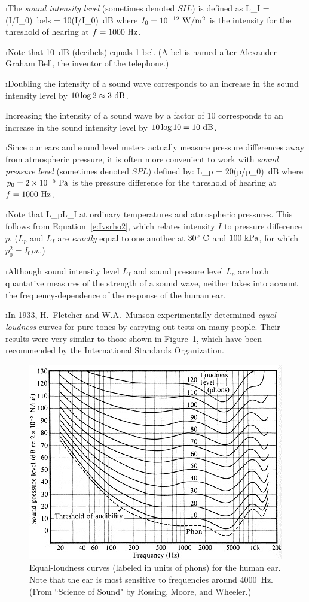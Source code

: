 \i The {\em sound intensity level} 
(sometimes denoted $SIL$) is defined as
%
\be
L_I = \log(I/I_0)\ {\rm bels}
= 10\log(I/I_0)\ {\rm dB}
\ee
%
where $I_0=10^{-12}~{\rm W}/{\rm m}^2$ is the intensity
for the threshold of hearing at $f=1000~{\rm Hz}$.

\i Note that 10~dB (decibels) equals 1 bel.
(A bel is named after Alexander Graham Bell, the inventor
of the telephone.)

\i \ex Doubling the intensity of a sound wave
corresponds to an increase in the sound intensity 
level by $10\log 2 \approx 3~{\rm dB}$.

\ex Increasing the intensity of a sound wave by
a factor of 10 corresponds to an increase in the 
sound intensity level by $10\log 10 = 10~{\rm dB}$.

\i Since our ears and sound level meters actually
measure pressure differences away from atmospheric
pressure, it is often more convenient to work with
{\em sound pressure level} (sometimes denoted $SPL$) 
defined by:
%
\be
L_p = 20\log(p/p_0)\ {\rm dB}
\ee
%
where $p_0=2\times 10^{-5}~{\rm Pa}$ is the 
pressure difference 
for the threshold of hearing at $f=1000~{\rm Hz}$.

\i Note that 
%
\be
L_p\approx L_I
\ee
%
at ordinary temperatures and atmospheric pressures.
This follows from Equation~\ref{e:Ivsrho2}, which
relates intensity $I$ to pressure difference $p$.
($L_p$ and $L_I$ are {\em exactly} equal to one another
at $30^\circ~{\rm C}$ and $100~{\rm kPa}$, for which
$p_0^2 = I_0\rho v$.)

\i Although sound intensity level $L_I$ and sound 
pressure level $L_p$ are both 
quantative measures of the strength of a sound wave,
neither takes into account the frequency-dependence
of the response of the human ear.

\i In 1933, H.~Fletcher and W.A.~Munson experimentally 
determined {\em equal-loudness} curves for pure 
tones by carrying out tests on many people.
Their results were very similar to those shown
in Figure~\ref{f:equal-loudness}, which have been
recommended by the International Standards Organization.
%
\begin{figure}[htbp]
\begin{center}
\includegraphics[width=.6\textwidth]{equal-loudness.jpg}
\caption{Equal-loudness curves (labeled in units of phons) 
for the human ear.
Note that the ear is most sensitive to frequencies around 4000~Hz.
(From ``Science of Sound" by Rossing, Moore, and Wheeler.)}
\label{f:equal-loudness}
\end{center}
\end{figure}
%

